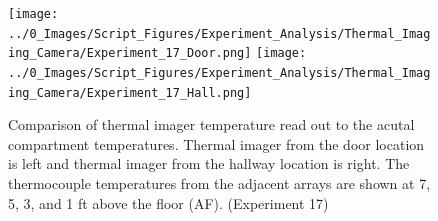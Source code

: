 \documentclass[12pt,oneside]{book}
\begin{document}

\begin{figure}[H]
\centering
\texttt{[image: ../0\_Images/Script\_Figures/Experiment\_Analysis/Thermal\_Imaging\_Camera/Experiment\_17\_Door.png]}
\texttt{[image: ../0\_Images/Script\_Figures/Experiment\_Analysis/Thermal\_Imaging\_Camera/Experiment\_17\_Hall.png]}
\caption[Thermal Imager H]{Comparison of thermal imager temperature read out to the acutal compartment temperatures. Thermal imager from the door location is left and thermal imager from the hallway location is right. The thermocouple temperatures from the adjacent arrays are shown at 7, 5, 3, and 1 ft above the floor (AF). (Experiment 17)}
\label{fig:thermal_imager_i}
\end{figure}
\end{document}

